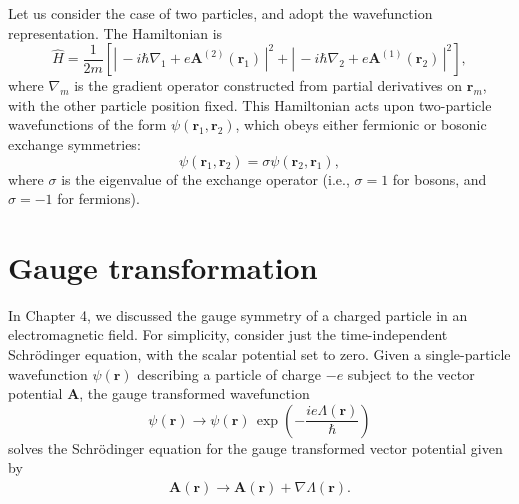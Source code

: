 \documentclass[pra,12pt]{revtex4}
\begin{document}
Let us consider the case of two particles, and adopt the wavefunction
representation.  The Hamiltonian is
\begin{equation}
  \hat{H} = \frac{1}{2m} \left[ \left| \, -i\hbar \nabla_1
  + e\mathbf{A}^{(2)}(\mathbf{r}_1)\,\right|^2
  + \left| \, -i\hbar \nabla_2
  + e\mathbf{A}^{(1)}(\mathbf{r}_2)\,\right|^2\right],
  \label{HamA}
\end{equation}
where $\nabla_m$ is the gradient operator constructed from partial
derivatives on $\mathbf{r}_m$, with the other particle position fixed.
This Hamiltonian acts upon two-particle wavefunctions of the form
$\psi(\mathbf{r}_1, \mathbf{r}_2)$, which obeys either fermionic or
bosonic exchange symmetries:
\begin{equation}
  \psi(\mathbf{r}_1, \mathbf{r}_2) = \sigma \psi(\mathbf{r}_2, \mathbf{r}_1),
  \label{exchange}
\end{equation}
where $\sigma$ is the eigenvalue of the exchange operator (i.e.,
$\sigma = 1$ for bosons, and $\sigma = -1$ for fermions).

\section{Gauge transformation}

In Chapter 4, we discussed the gauge symmetry of a charged particle in
an electromagnetic field.  For simplicity, consider just the
time-independent Schr\"odinger equation, with the scalar potential set
to zero.  Given a single-particle wavefunction $\psi(\mathbf{r})$
describing a particle of charge $-e$ subject to the vector potential
$\mathbf{A}$, the gauge transformed wavefunction
\begin{equation}
  \psi(\mathbf{r}) \rightarrow \psi(\mathbf{r}) \, \exp\left(-\frac{ie\Lambda(\mathbf{r})}{\hbar}\right)
\end{equation}
solves the Schr\"odinger equation for the gauge transformed vector
potential given by
\begin{align}
  \mathbf{A}(\mathbf{r}) \rightarrow \mathbf{A}(\mathbf{r}) + \nabla \Lambda(\mathbf{r}).
\end{align}
\end{document}
